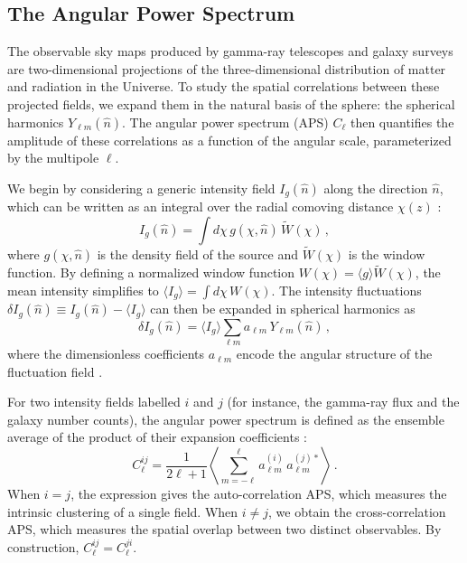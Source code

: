 \subsection{The Angular Power Spectrum}
\label{sec:angular_power_spectrum}

The observable sky maps produced by gamma-ray telescopes and galaxy surveys are two-dimensional projections of the three-dimensional distribution of matter and radiation in the Universe.
To study the spatial correlations between these projected fields, we expand them in the natural basis of the sphere: the spherical harmonics $Y_{\ell m}(\hat{n})$.
The angular power spectrum (APS) $C_\ell$ then quantifies the amplitude of these correlations as a function of the angular scale, parameterized by the multipole $\ell$.

We begin by considering a generic intensity field $I_g(\hat{n})$ along the direction $\hat{n}$, which can be written as an integral over the radial comoving distance $\chi(z)$ \cite{Fornengo:2013rga,Camera:2012cj}:
\begin{equation}
	I_g(\hat{n}) = \int d\chi\, g(\chi, \hat{n})\, \tilde{W}(\chi)\,,
	\label{eq:intensity_field}
\end{equation}
where $g(\chi, \hat{n})$ is the density field of the source and $\tilde{W}(\chi)$ is the window function.
By defining a normalized window function $W(\chi) = \langle g \rangle \tilde{W}(\chi)$, the mean intensity simplifies to $\langle I_g \rangle = \int d\chi\, W(\chi)$.
The intensity fluctuations $\delta I_g(\hat{n}) \equiv I_g(\hat{n}) - \langle I_g \rangle$ can then be expanded in spherical harmonics as
\begin{equation}
	\delta I_g(\hat{n}) = \langle I_g \rangle \sum_{\ell m} a_{\ell m}\, Y_{\ell m}(\hat{n})\,,
	\label{eq:spherical_harmonic_expansion}
\end{equation}
where the dimensionless coefficients $a_{\ell m}$ encode the angular structure of the fluctuation field \cite{Fornengo:2013rga}.

For two intensity fields labelled $i$ and $j$ (for instance, the gamma-ray flux and the galaxy number counts), the angular power spectrum is defined as the ensemble average of the product of their expansion coefficients \cite{Fornengo:2013rga,Camera:2012cj}:
\begin{equation}
	C_\ell^{ij} = \frac{1}{2\ell+1} \left\langle \sum_{m=-\ell}^{\ell} a_{\ell m}^{(i)}\, a_{\ell m}^{(j)*} \right\rangle\,.
	\label{eq:aps_definition}
\end{equation}
When $i = j$, the expression gives the auto-correlation APS, which measures the intrinsic clustering of a single field.
When $i \neq j$, we obtain the cross-correlation APS, which measures the spatial overlap between two distinct observables.
By construction, $C_\ell^{ij} = C_\ell^{ji}$.

